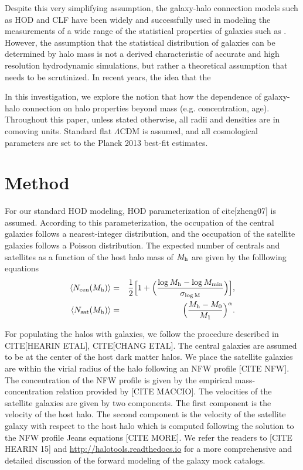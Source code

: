 \documentclass[12pt, preprint]{aastex}
\begin{document}
Despite this very simplifying assumption, the galaxy-halo connection models such as HOD and CLF
have been widely and successfully used in modeling the measurements of a wide range of the 
statistical properties of galaxies such as . However, the assumption that the statistical 
distribution of galaxies can be determined by halo mass is not a derived characteristic of 
accurate and high resolution hydrodynamic simulations, but rather a theoretical assumption 
that needs to be scrutinized. In recent years, the idea that the   

In this investigation, we explore the notion that how the dependence of 
galaxy-halo connection on halo properties beyond mass (e.g. concentration, age).
Throughout this paper, unless stated otherwise, 
all radii and densities are in comoving units. Standard flat $\Lambda$CDM is assumed, 
and all cosmological parameters are set to the Planck 2013 best-fit estimates.

\section{Method}
For our standard HOD modeling, HOD parameterization of cite[zheng07] is assumed. According to this parameterization, the occupation of the central galaxies follows a nearest-integer distribution, 
and the occupation of the satellite galaxies follows a Poisson distribution. The expected number of centrals and satellites as a function of the host halo mass of $M_{\rm h}$ are given by the folllowing equations 
\begin{eqnarray}
\langle N_{\rm cen}(M_{\rm h}) \rangle &=& \frac{1}{2}\Big[1+\Big(\frac{\log M_{\rm h} - \log M_{\rm min}}{\sigma_{\log \rm{M}}} \Big) \Big], \label{hod:central}\\ 
\langle N_{\rm sat}(M_{\rm h}) \rangle &=& \Big( \frac{M_{\rm h} - M_{\rm{0}}}{M_{\rm 1}} \Big)^{\alpha}. \label{hod:satellite}
\end{eqnarray}

For populating the halos with galaxies, we follow the procedure described in CITE[HEARIN ETAL], CITE[CHANG ETAL]. The central galaxies are assumed to be at the center of the host dark matter halos. We place the satellite galaxies are within the virial radius of the halo following an NFW profile [CITE NFW]. The concentration of the NFW profile is given by the empirical mass-concentration relation provided by [CITE MACCIO]. The velocities of the satellite galaxies are given by two components. The first component is the velocity of the host halo. The second component is the velocity of the satellite galaxy with respect to the host halo which is computed following the solution to the NFW profile Jeans equations [CITE MORE]. We refer the readers to [CITE HEARIN 15] and \url{http://halotools.readthedocs.io} for a more comprehensive and detailed discussion of the forward modeling of the galaxy mock catalogs. 
\end{document}
